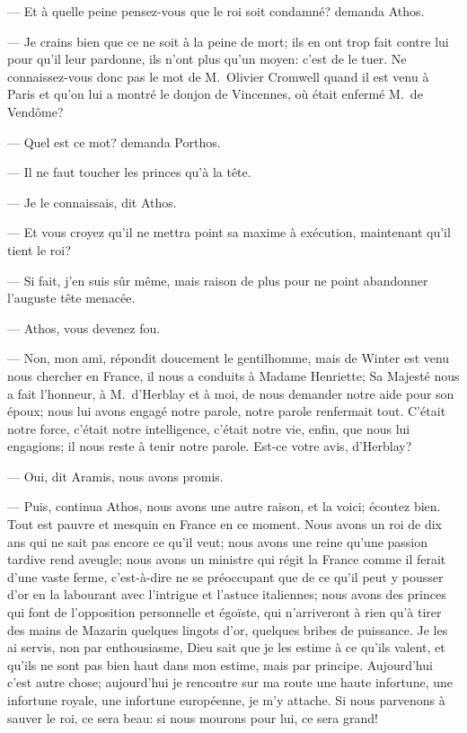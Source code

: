 — Et à quelle peine pensez-vous que le roi soit condamné? demanda Athos.

— Je crains bien que ce ne soit à la peine de mort; ils en ont trop fait contre lui pour qu'il leur pardonne, ils n'ont plus qu'un moyen: c'est de le tuer. Ne connaissez-vous donc pas le mot de M.~Olivier Cromwell quand il est venu à Paris et qu'on lui a montré le donjon de Vincennes, où était enfermé M.~de Vendôme?

— Quel est ce mot? demanda Porthos.

— Il ne faut toucher les princes qu'à la tête.

— Je le connaissais, dit Athos.

— Et vous croyez qu'il ne mettra point sa maxime à exécution, maintenant qu'il tient le roi?

— Si fait, j'en suis sûr même, mais raison de plus pour ne point abandonner l'auguste tête menacée.

— Athos, vous devenez fou.

— Non, mon ami, répondit doucement le gentilhomme, mais de Winter est venu nous chercher en France, il nous a conduits à Madame Henriette; Sa Majesté nous a fait l'honneur, à M.~d'Herblay et à moi, de nous demander notre aide pour son époux; nous lui avons engagé notre parole, notre parole renfermait tout. C'était notre force, c'était notre intelligence, c'était notre vie, enfin, que nous lui engagions; il nous reste à tenir notre parole. Est-ce votre avis, d'Herblay?

— Oui, dit Aramis, nous avons promis.

— Puis, continua Athos, nous avons une autre raison, et la voici; écoutez bien. Tout est pauvre et mesquin en France en ce moment. Nous avons un roi de dix ans qui ne sait pas encore ce qu'il veut; nous avons une reine qu'une passion tardive rend aveugle; nous avons un ministre qui régit la France comme il ferait d'une vaste ferme, c'est-à-dire ne se préoccupant que de ce qu'il peut y pousser d'or en la labourant avec l'intrigue et l'astuce italiennes; nous avons des princes qui font de l'opposition personnelle et égoïste, qui n'arriveront à rien qu'à tirer des mains de Mazarin quelques lingots d'or, quelques bribes de puissance. Je les ai servis, non par enthousiasme, Dieu sait que je les estime à ce qu'ils valent, et qu'ils ne sont pas bien haut dans mon estime, mais par principe. Aujourd'hui c'est autre chose; aujourd'hui je rencontre sur ma route une haute infortune, une infortune royale, une infortune européenne, je m'y attache. Si nous parvenons à sauver le roi, ce sera beau: si nous mourons pour lui, ce sera grand!

